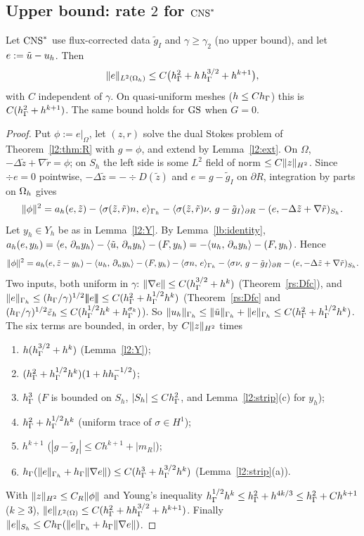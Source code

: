 \subsection{Upper bound: rate \texorpdfstring{$2$}{2} for \texorpdfstring{$\mathrm{CNS}^\ast$}{CNS*}}

\begin{theorem}\label{l2:thm:L1}
Let $\mathrm{CNS}^\ast$ use flux-corrected data $\tilde g_I$ and $\gamma\ge\gamma_2$ (no upper bound), and let $e:=\tilde u-u_h$. Then
\[
\lVert e\rVert_{L^2(\Omega_h)}\le C\bigl(h_\Gamma^2+h\,h_\Gamma^{3/2}+h^{k+1}\bigr),
\]
with $C$ independent of $\gamma$. On quasi-uniform meshes ($h\le Ch_\Gamma$) this is $C(h_\Gamma^2+h^{k+1})$. The same bound holds for $\mathrm{GS}$ when $G=0$.
\end{theorem}

\begin{proof}
Put $\phi:=e|_\Omega$, let $(z,r)$ solve the dual Stokes problem of Theorem~\ref{l2:thm:R} with $g=\phi$, and extend by Lemma~\ref{l2:ext}. On $\Omega$, $-\Delta\tilde z+\nabla\tilde r=\phi$; on $S_h$ the left side is some $L^2$ field of norm $\le C\lVert z\rVert_{H^2}$. Since $\div e=0$ pointwise, $-\Delta\tilde z=-\div D(\tilde z)$ and $e=g-\tilde g_I$ on $\partial R$, integration by parts on $\Omega_h$ gives
\[
\lVert \phi\rVert^2=a_h(e,\tilde z)-\langle \sigma(\tilde z,\tilde r)n,\, e\rangle_{\Gamma_h}-\langle \sigma(\tilde z,\tilde r)\nu,\, g-\tilde g_I\rangle_{\partial R}-(e,-\Delta\tilde z+\nabla\tilde r)_{S_h}.
\]
Let $y_h\in Y_h$ be as in Lemma~\ref{l2:Y}. By Lemma~\ref{lb:identity}, $a_h(e,y_h)=\langle e,\, \partial_n y_h\rangle-\langle \tilde u,\, \partial_n y_h\rangle-(F,y_h)=-\langle u_h,\, \partial_n y_h\rangle-(F,y_h)$. Hence
\[
\lVert \phi\rVert^2=a_h(e,\tilde z-y_h)-\langle u_h,\, \partial_n y_h\rangle-(F,y_h)-\langle \sigma n,\, e\rangle_{\Gamma_h}-\langle \sigma\nu,\, g-\tilde g_I\rangle_{\partial R}-(e,-\Delta\tilde z+\nabla\tilde r)_{S_h}.
\]
Two inputs, both uniform in $\gamma$: $\lVert \nabla e\rVert\le C(h_\Gamma^{3/2}+h^k)$ (Theorem~\ref{rs:Dfc}), and $\lVert e\rVert_{\Gamma_h}\le(h_\Gamma/\gamma)^{1/2}|\!|\!|e|\!|\!|\le C(h_\Gamma^2+h_\Gamma^{1/2}h^k)$ (Theorem~\ref{rs:Dfc} and $(h_\Gamma/\gamma)^{1/2}\tilde\varepsilon_h\le C(h_\Gamma^{1/2}h^k+h_\Gamma^{\sigma_k})$). So $\lVert u_h\rVert_{\Gamma_h}\le\lVert \tilde u\rVert_{\Gamma_h}+\lVert e\rVert_{\Gamma_h}\le C(h_\Gamma^2+h_\Gamma^{1/2}h^k)$. The six terms are bounded, in order, by $C\lVert z\rVert_{H^2}$ times
\begin{enumerate}
\item $h(h_\Gamma^{3/2}+h^k)$ (Lemma~\ref{l2:Y});
\item $(h_\Gamma^2+h_\Gamma^{1/2}h^k)(1+hh_\Gamma^{-1/2})$;
\item $h_\Gamma^3$ ($F$ is bounded on $S_h$, $|S_h|\le Ch_\Gamma^2$, and Lemma~\ref{l2:strip}(c) for $y_h$);
\item $h_\Gamma^2+h_\Gamma^{1/2}h^k$ (uniform trace of $\sigma\in H^1$);
\item $h^{k+1}$ ($|g-\tilde g_I|\le Ch^{k+1}+|m_R|$);
\item $h_\Gamma(\lVert e\rVert_{\Gamma_h}+h_\Gamma\lVert \nabla e\rVert)\le C(h_\Gamma^3+h_\Gamma^{3/2}h^k)$ (Lemma~\ref{l2:strip}(a)).
\end{enumerate}
With $\lVert z\rVert_{H^2}\le C_R\lVert \phi\rVert$ and Young's inequality $h_\Gamma^{1/2}h^k\le h_\Gamma^2+h^{4k/3}\le h_\Gamma^2+Ch^{k+1}$ ($k\ge3$), $\lVert e\rVert_{L^2(\Omega)}\le C(h_\Gamma^2+hh_\Gamma^{3/2}+h^{k+1})$. Finally $\lVert e\rVert_{S_h}\le Ch_\Gamma(\lVert e\rVert_{\Gamma_h}+h_\Gamma\lVert \nabla e\rVert)$.


\end{proof}
